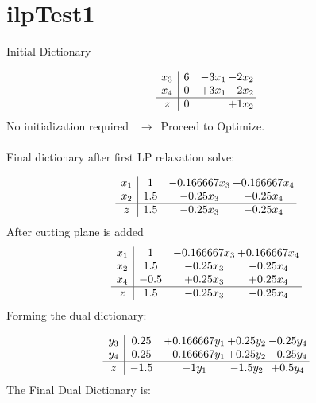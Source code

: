 \documentclass[11pt]{article}
\begin{document}
\section{ilpTest1}

Initial Dictionary 

\[\begin{array}{c| c c@{\hskip 2pt} c@{\hskip 2pt} }
 x_{3}   &  6 & -3 x_{1} & -2 x_{2}\\
 x_{4}   &  0 & + 3 x_{1} & -2 x_{2}\\
\hline
z    &  0  &   & + 1 x_{2}\\
\end{array}\]
No initialization required \ $\rightarrow$\  Proceed to Optimize. \\\\ 
Final dictionary after first LP relaxation solve: 

\[\begin{array}{c| c c@{\hskip 2pt} c@{\hskip 2pt} }
 x_{1}   &  1 & -0.166667 x_{3} & + 0.166667 x_{4}\\
 x_{2}   &  1.5 & -0.25 x_{3} & -0.25 x_{4}\\
\hline
z    &  1.5 & -0.25 x_{3} & -0.25 x_{4}\\
\end{array}\]
 After cutting plane is added 
\[\begin{array}{c| c c@{\hskip 2pt} c@{\hskip 2pt} }
 x_{1}   &  1 & -0.166667 x_{3} & + 0.166667 x_{4}\\
 x_{2}   &  1.5 & -0.25 x_{3} & -0.25 x_{4}\\
 x_{4}   &  -0.5 & + 0.25 x_{3} & + 0.25 x_{4}\\
\hline
z    &  1.5 & -0.25 x_{3} & -0.25 x_{4}\\
\end{array}\]
Forming the dual dictionary:

\[\begin{array}{c| c c@{\hskip 2pt} c@{\hskip 2pt} c@{\hskip 2pt} }
 y_{3}   &  0.25 & + 0.166667 y_{1} & + 0.25 y_{2} & -0.25 y_{4}\\
 y_{4}   &  0.25 & -0.166667 y_{1} & + 0.25 y_{2} & -0.25 y_{4}\\
\hline
z    &  -1.5 & -1 y_{1} & -1.5 y_{2} & + 0.5 y_{4}\\
\end{array}\]
The Final Dual Dictionary is: 
\end{document}
